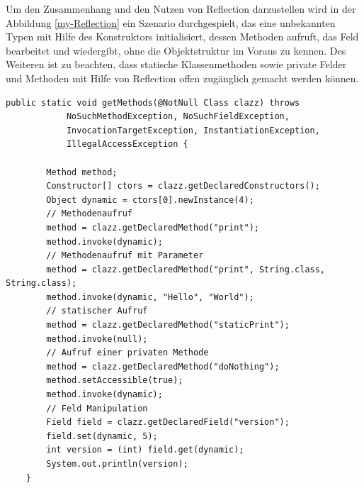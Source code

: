 \bigbreak
Um den Zusammenhang und den Nutzen von Reflection darzustellen wird in der Abbildung \ref{my-Reflection} ein Szenario durchgespielt, das eine unbekannten Typen mit Hilfe des Konstruktors initialisiert, dessen Methoden aufruft, das Feld bearbeitet und wiedergibt, ohne die Objektstruktur im Voraus zu kennen. 
Des Weiteren ist zu beachten, dass statische Klassenmethoden sowie private Felder und Methoden mit Hilfe von Reflection offen zugänglich gemacht werden können.

\newpage 
\begin{lstlisting}[caption=Reflection in Aktion,label=my-Reflection,captionpos=b]
    public static void getMethods(@NotNull Class clazz) throws
            NoSuchMethodException, NoSuchFieldException,
            InvocationTargetException, InstantiationException,
            IllegalAccessException {

        Method method;
        Constructor[] ctors = clazz.getDeclaredConstructors();
        Object dynamic = ctors[0].newInstance(4);
        // Methodenaufruf 
        method = clazz.getDeclaredMethod("print");
        method.invoke(dynamic);
        // Methodenaufruf mit Parameter
        method = clazz.getDeclaredMethod("print", String.class, String.class);
        method.invoke(dynamic, "Hello", "World");
        // statischer Aufruf
        method = clazz.getDeclaredMethod("staticPrint");
        method.invoke(null);
        // Aufruf einer privaten Methode
        method = clazz.getDeclaredMethod("doNothing");
        method.setAccessible(true);
        method.invoke(dynamic);
        // Feld Manipulation
        Field field = clazz.getDeclaredField("version");
        field.set(dynamic, 5);
        int version = (int) field.get(dynamic);
        System.out.println(version);
    }
\end{lstlisting}

